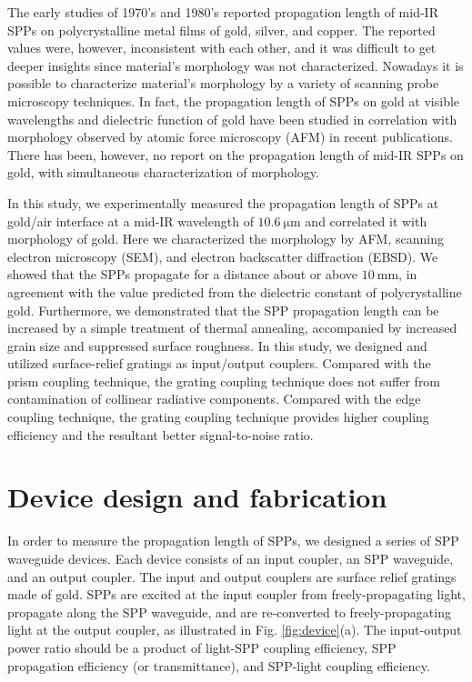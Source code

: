 \documentclass[aip,apl,reprint]{revtex4-1}
\begin{document}
The early studies of 1970's and 1980's reported propagation length of mid-IR SPPs on polycrystalline metal films of gold,\cite{McMullen, Schlesinger1, Schlesinger2} silver,\cite{Schlesinger1, Schlesinger2} and copper.\cite{Schoenwald, Shiba} The reported values were, however, inconsistent with each other, and it was difficult to get deeper insights since material's morphology was not characterized. Nowadays it is possible to characterize material's morphology by a variety of scanning probe microscopy techniques. In fact, the propagation length of SPPs on gold at visible wavelengths\cite{Kuttge} and dielectric function of gold\cite{Trollmann, Olmon} have been studied in correlation with morphology observed by atomic force microscopy (AFM) in recent publications. There has been, however, no report on the propagation length of mid-IR SPPs on gold, with simultaneous characterization of morphology.

In this study, we experimentally measured the propagation length of SPPs at gold/air interface at a mid-IR wavelength of $10.6\:\mathrm{\mu m}$ and correlated it with morphology of gold. Here we characterized the morphology by AFM, scanning electron microscopy (SEM), and electron backscatter diffraction (EBSD). We showed that the SPPs propagate for a distance about or above $10\:\mathrm{mm}$, in agreement with the value predicted from the dielectric constant of polycrystalline gold. Furthermore, we demonstrated that the SPP propagation length can be increased by a simple treatment of thermal annealing, accompanied by increased grain size and suppressed surface roughness.
In this study, we designed and utilized surface-relief gratings as input/output couplers. Compared with the prism coupling technique,\cite{Schoenwald, Shiba} the grating coupling technique does not suffer from contamination of collinear radiative components.\cite{Schlesinger1, Schlesinger2} Compared with the edge coupling technique,\cite{Schlesinger1, Schlesinger2} the grating coupling technique provides higher coupling efficiency and the resultant better signal-to-noise ratio. 

\section{Device design and fabrication}
\label{sec:device}
In order to measure the propagation length of SPPs, we designed a series of SPP waveguide devices. Each device consists of an input coupler, an SPP waveguide, and an output coupler.  The input and output couplers are surface relief gratings made of gold. SPPs are  excited at the input coupler from freely-propagating light, propagate along the SPP waveguide, and are re-converted to freely-propagating light at the output coupler, as illustrated in Fig. \ref{fig:device}(a). The input-output power ratio should be a product of light-SPP coupling efficiency, SPP propagation efficiency (or transmittance), and SPP-light coupling efficiency. 
\end{document}
